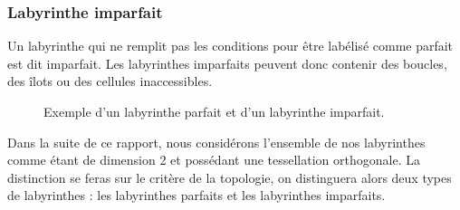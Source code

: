 \subsubsection{Labyrinthe imparfait}
Un labyrinthe qui ne remplit pas les conditions pour être labélisé comme parfait est dit imparfait. Les labyrinthes imparfaits peuvent donc contenir des boucles, des îlots ou des cellules inaccessibles.


\begin{figure}[htp] 
    \centering
    \hfill%
    \caption{Exemple d'un labyrinthe parfait et d'un labyrinthe imparfait.}
\end{figure}




Dans la suite de ce rapport, nous considérons l'ensemble de nos labyrinthes comme étant de dimension 2 et possédant une tessellation orthogonale. La distinction se feras sur le critère de la topologie, on distinguera alors deux types de labyrinthes : les labyrinthes parfaits et les labyrinthes imparfaits.

\newpage
